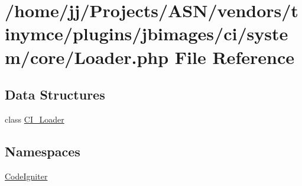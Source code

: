 \hypertarget{_loader_8php}{}\section{/home/jj/\+Projects/\+A\+S\+N/vendors/tinymce/plugins/jbimages/ci/system/core/\+Loader.php File Reference}
\label{_loader_8php}
\subsection*{Data Structures}
\begin{DoxyCompactItemize}
\item 
class \hyperlink{class_c_i___loader}{C\+I\+\_\+\+Loader}
\end{DoxyCompactItemize}
\subsection*{Namespaces}
\begin{DoxyCompactItemize}
\item 
 \hyperlink{namespace_code_igniter}{Code\+Igniter}
\end{DoxyCompactItemize}
